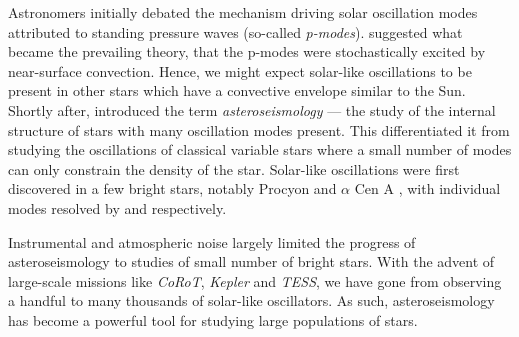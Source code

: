 Astronomers initially debated the mechanism driving solar oscillation modes attributed to standing pressure waves (so-called \emph{p-modes}). \citet{Goldreich.Keeley1977} suggested what became the prevailing theory, that the p-modes were stochastically excited by near-surface convection. Hence, we might expect solar-like oscillations to be present in other stars which have a convective envelope similar to the Sun. Shortly after, \citet{Christensen-Dalsgaard1984} introduced the term \emph{asteroseismology} --- the study of the internal structure of stars with many oscillation modes present. This differentiated it from studying the oscillations of classical variable stars where a small number of modes can only constrain the density of the star. Solar-like oscillations were first discovered in a few bright stars, notably Procyon and \(\alpha\) Cen A \citep{Gelly.Grec.ea1986}, with individual modes resolved by \citet{Martic.Schmitt.ea1999} and \citet{Bouchy.Carrier2001} respectively.


Instrumental and atmospheric noise largely limited the progress of asteroseismology to studies of small number of bright stars. With the advent of large-scale missions like \emph{CoRoT}, \emph{Kepler} and \emph{TESS}, we have gone from observing a handful to many thousands of solar-like oscillators. As such, asteroseismology has become a powerful tool for studying large populations of stars.

